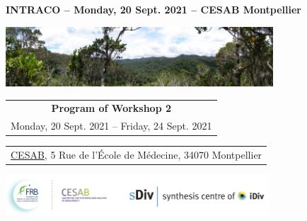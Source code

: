 {

  \begin{frame}
    \begin{center}
        \small{\textbf{INTRACO -- Monday, 20 Sept. 2021 -- CESAB Montpellier}}
    \end{center}
    \vspace{-0.25cm}
    \titlepage %
    \vspace{-2.5cm}
    \begin{center}
      \includegraphics[width=10cm]{figs/Banniere.png}
    \end{center}
    \vspace{0.25cm}
    \begin{center}

        \begin{tabular}{c}
          \textbf{Program of Workshop 2}\\
          Monday, 20 Sept. 2021 -- Friday, 24 Sept. 2021
        \end{tabular}

      \vspace{0.25cm}

      {\small
        \begin{tabular}{c}
\href{https://www.fondationbiodiversite.fr/la-fondation/le-cesab/}{CESAB}, 5 Rue de l'École de Médecine, 34070 Montpellier
        \end{tabular}
      }

      \vspace{0.25cm}
      \includegraphics[height=1.5cm]{figs/logos-FRB-Cesab-iDiv-sDiv}

    \end{center}
    
  \end{frame}
}
\setcounter{framenumber}{0}


